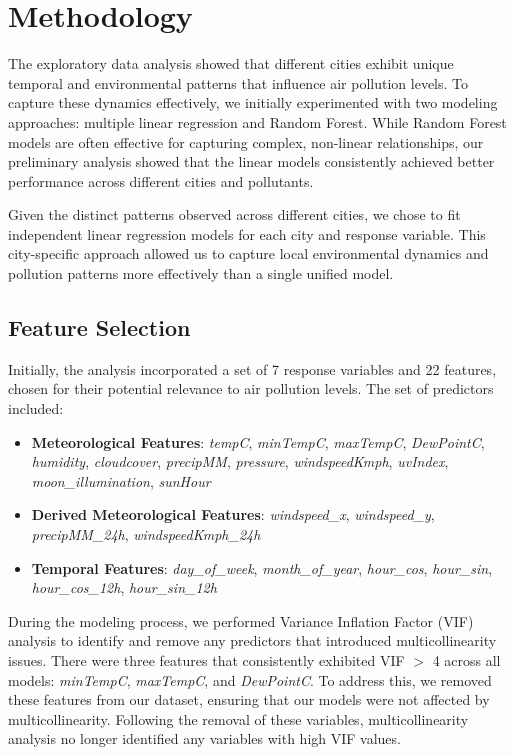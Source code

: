 \documentclass[twoside,11pt]{article}
\begin{document}
\section{Methodology}

The exploratory data analysis showed that different cities exhibit unique temporal and environmental patterns that influence air pollution levels. To capture these dynamics effectively, we initially experimented with two modeling approaches: multiple linear regression and Random Forest. While Random Forest models are often effective for capturing complex, non-linear relationships, our preliminary analysis showed that the linear models consistently achieved better performance across different cities and pollutants.

Given the distinct patterns observed across different cities, we chose to fit independent linear regression models for each city and response variable. This city-specific approach allowed us to capture local environmental dynamics and pollution patterns more effectively than a single unified model.

\subsection{Feature Selection} \label{subsection:feature_selection}

Initially, the analysis incorporated a set of 7 response variables and 22 features, chosen for their potential relevance to air pollution levels. The set of predictors included:

\begin{itemize}
  \item \textbf{Meteorological Features}: \textit{tempC}, \textit{minTempC}, \textit{maxTempC}, \textit{DewPointC}, \textit{humidity}, \textit{cloudcover}, \textit{precipMM}, \textit{pressure}, \textit{windspeedKmph}, \textit{uvIndex}, \textit{moon\_illumination}, \textit{sunHour}
  \item \textbf{Derived Meteorological Features}: \textit{windspeed\_x}, \textit{windspeed\_y}, \textit{precipMM\_24h}, \textit{windspeedKmph\_24h}
  \item \textbf{Temporal Features}: \textit{day\_of\_week}, \textit{month\_of\_year}, \textit{hour\_cos}, \textit{hour\_sin}, \textit{hour\_cos\_12h}, \textit{hour\_sin\_12h}
\end{itemize}

During the modeling process, we performed Variance Inflation Factor (VIF) analysis to identify and remove any predictors that introduced multicollinearity issues. There were three features that consistently exhibited VIF $>$ 4 across all models: \textit{minTempC}, \textit{maxTempC}, and \textit{DewPointC}. To address this, we removed these features from our dataset, ensuring that our models were not affected by multicollinearity. Following the removal of these variables, multicollinearity analysis no longer identified any variables with high VIF values.
\end{document}
